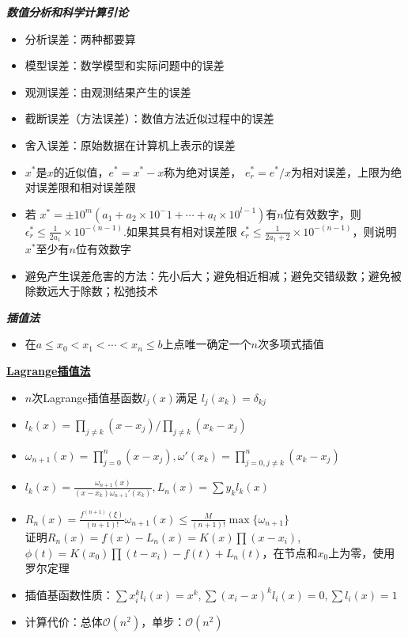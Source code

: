 \documentclass[UTF8,a4paper,landscape,compress]{paper}
\renewcommand{\subsection}[1]{{\small\textbf{\underline{#1}}}\\ }
\renewcommand{\section}[1]{{\normalsize\textbf{\emph{#1}}}\\ }
\newcommand{\List}[1]{\begin{itemize}[fullwidth,itemindent=0em] #1 \end{itemize}}
\begin{document}
\footnotesize
\begin{multicols}{4}
\section{数值分析和科学计算引论}
    \List{
    \item {分析误差：两种都要算}
    \item {模型误差：数学模型和实际问题中的误差}
    \item {观测误差：由观测结果产生的误差}
    \item {截断误差（方法误差）：数值方法近似过程中的误差}
    \item {舍入误差：原始数据在计算机上表示的误差}
    \item {$x^*$是$x$的近似值，$e^* = x^* - x$称为绝对误差，
    $e^*_r = e^* / x $为相对误差，上限为绝对误差限和相对误差限}
    \item {若 $x^* = \pm 10^m (a_1 + a_2 \times 10^-1 + \cdots + a_l \times 10^{l-1})$有$n$位有效数字，则
    $\epsilon^*_r \le \frac{1}{2a_1}\times 10^{-(n-1)}$.如果其具有相对误差限
    $\epsilon^*_r \le \frac{1}{2a_1 + 2} \times 10 ^{-(n-1)}$，则说明$x^*$至少有$n$位有效数字}
    \item {避免产生误差危害的方法：先小后大；避免相近相减；避免交错级数；避免被除数远大于除数；松弛技术}
    }
\section{插值法}
    \List{
        \item {在$a\le x_0<x_1<\cdots<x_n\le b$上点唯一确定一个$n$次多项式插值}
    }
    \subsection{Lagrange插值法}
    \List{
        \item {$n$次Lagrange插值基函数$l_j(x)$满足
        $l_j(x_k) = \delta_{kj}$}
        \item {$l_k(x) =\prod_{j\ne k} (x-x_j) / \prod_{j\ne k} (x_k-x_j)$}
        \item {$\omega_{n+1}(x) = \displaystyle{\prod_{j=0}^n(x-x_j)}, \omega'(x_k)=\displaystyle{\prod_{j=0,j\ne k}^n(x_k-x_j)}$}
        \item {$l_k(x) = \frac{\omega_{n+1}(x)}{(x-x_k)\omega_{n+1}'(x_k)},L_n(x)=\sum y_kl_k(x)$}
        \item {$R_n(x) = \frac{f^{(n+1)}(\xi)}{(n+1)!}\omega_{n+1}(x) \le \frac{M}{(n+1)!}
        \max\{\omega_{n+1}\}$\\ 证明$R_n(x) = f(x)-L_n(x) = K(x)\prod(x-x_i)$,$\phi(t) = K(x_0)\prod(t-x_i) -f(t) + L_n(t)$，在节点和$x_0$上为零，使用罗尔定理}
        \item {插值基函数性质：$\sum x_i^k l_i(x) = x^k, \sum (x_i-x)^k l_i(x) = 0, \sum l_i(x) = 1$}
		\item {计算代价：总体$\mathcal O(n^2)$，单步：$\mathcal O(n^2)$}
    }

\end{multicols}
\end{document}
